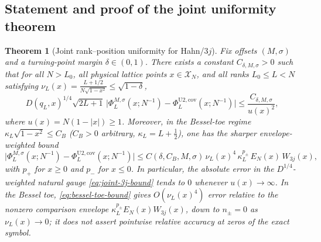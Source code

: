 \documentclass[11pt]{article}
\newtheorem{theorem}{Theorem}[section]
\theoremstyle{definition}
\theoremstyle{remark}
\newcommand{\cX}{\mathcal{X}}
\renewcommand{\_}{\oldunderscore\penalty0\hskip0pt\relax}
\begin{document}
\subsection{Statement and proof of the joint uniformity theorem}

\begin{theorem}[Joint rank--position uniformity for Hahn/$3j$]
\label{thm:joint-3j}
Fix offsets $(M,\sigma)$ and a turning-point margin $\delta\in(0,1)$. There exists a constant $C_{\delta,M,\sigma}>0$ such that
  for all $N>L_0$, all physical lattice points $x\in\cX_N$, and all ranks $L_0\le L<N$ satisfying
  $\nu_L(x)=\frac{L+1/2}{N\sqrt{1-x^2}}\le\sqrt{1-\delta}$,
\begin{equation}
  \boxed{D(q_L,x)^{1/4}\sqrt{2L+1}\,\bigl|\Phi_L^{M,\sigma}(x;N^{-1}) - \Phi_L^{\mathrm{U2,cov}}(x;N^{-1})\bigr| \le \frac{C_{\delta,M,\sigma}}{u(x)^2},}
  \label{eq:joint-3j-bound}
\end{equation}
where $u(x)=N(1-|x|)\ge 1$. Moreover, in the Bessel-toe regime $\kappa_L\sqrt{1-x^2}\le C_B$ ($C_B>0$ arbitrary,
  $\kappa_L=L+\frac12$), one has the sharper envelope-weighted bound
\begin{equation}
  \bigl|\Phi_L^{M,\sigma}(x;N^{-1}) - \Phi_L^{\mathrm{U2,cov}}(x;N^{-1})\bigr| \le C(\delta,C_B,M,\sigma)\,\nu_L(x)^4\,\kappa_L^{p_\pm}\,E_N(x)\,W_{3j}(x),
  \label{eq:bessel-toe-bound}
\end{equation}
with $p_+$ for $x\ge 0$ and $p_-$ for $x\le 0$. In particular, the absolute error in the $D^{1/4}$-weighted natural gauge \eqref{eq:joint-3j-bound} tends
  to $0$ whenever $u(x)\to\infty$. In the Bessel toe, \eqref{eq:bessel-toe-bound} gives $O(\nu_L(x)^4)$ error relative
  to the nonzero comparison envelope $\kappa_L^{p_\pm}E_N(x)W_{3j}(x)$, down to $n_\pm=0$ as $\nu_L(x)\to0$;
  it does not assert pointwise relative accuracy at zeros of the exact symbol.
\end{theorem}
\end{document}
